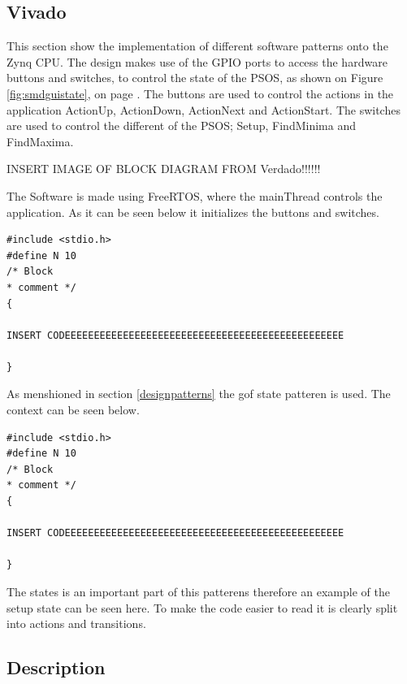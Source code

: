 \subsection{Vivado}
This section show the implementation of different software patterns onto the Zynq CPU. The design makes use of the GPIO ports to access the hardware buttons and switches, to control the state of the PSOS, as shown on Figure \ref{fig:smdguistate}, on page \pageref{fig:smdguistate}. The buttons are used to control the actions in the application ActionUp, ActionDown, ActionNext and ActionStart. The switches are used to control the different of the PSOS; Setup, FindMinima and FindMaxima.

INSERT IMAGE OF BLOCK DIAGRAM FROM Verdado!!!!!!

The Software is made using FreeRTOS, where the mainThread controls the application. As it can be seen below it initializes the buttons and switches.

\begin{lstlisting}[style=customc++, label={lst:listingExample}, caption={Example listing.}]
#include <stdio.h>
#define N 10
/* Block
* comment */
{

INSERT CODEEEEEEEEEEEEEEEEEEEEEEEEEEEEEEEEEEEEEEEEEEEEEEEE

}
\end{lstlisting}

As menshioned in section \ref{designpatterns} the gof state patteren is used. The context can be seen below.
\begin{lstlisting}[style=customc++, label={lst:listingExample}, caption={Example listing.}]
#include <stdio.h>
#define N 10
/* Block
* comment */
{

INSERT CODEEEEEEEEEEEEEEEEEEEEEEEEEEEEEEEEEEEEEEEEEEEEEEEE

}
\end{lstlisting}

The states is an important part of this patterens therefore an example of the setup state can be seen here. To make the code easier to read it is clearly split into actions and transitions. 


\subsection{Description}

\noindent{}